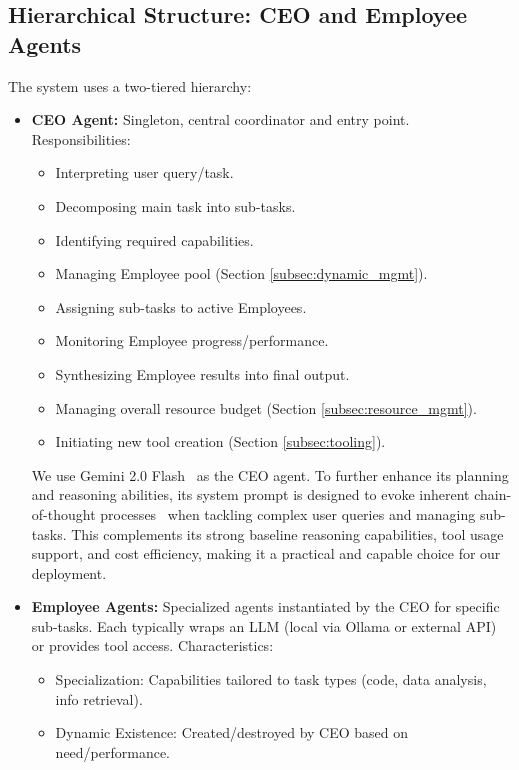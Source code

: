 \documentclass[conference]{IEEEtran}
\begin{document}
\subsection{Hierarchical Structure: CEO and Employee Agents}
The system uses a two-tiered hierarchy:

\begin{itemize}
    \item \textbf{CEO Agent:} Singleton, central coordinator and entry point. Responsibilities:
        \begin{itemize}
            \item Interpreting user query/task.
            \item Decomposing main task into sub-tasks.
            \item Identifying required capabilities.
            \item Managing Employee pool (Section \ref{subsec:dynamic_mgmt}).
            \item Assigning sub-tasks to active Employees.
            \item Monitoring Employee progress/performance.
            \item Synthesizing Employee results into final output.
            \item Managing overall resource budget (Section \ref{subsec:resource_mgmt}).
            \item Initiating new tool creation (Section \ref{subsec:tooling}).
        \end{itemize}
        We use Gemini 2.0 Flash~\cite{gemini20flash} as the CEO agent. To further enhance its planning and reasoning abilities, its system prompt is designed to evoke inherent chain-of-thought processes~\cite{wei2022chain} when tackling complex user queries and managing sub-tasks. This complements its strong baseline reasoning capabilities, tool usage support, and cost efficiency, making it a practical and capable choice for our deployment.
    \item \textbf{Employee Agents:} Specialized agents instantiated by the CEO for specific sub-tasks. Each typically wraps an LLM (local via Ollama \cite{ollama} or external API) or provides tool access. Characteristics:
        \begin{itemize}
            \item Specialization: Capabilities tailored to task types (code, data analysis, info retrieval).
            \item Dynamic Existence: Created/destroyed by CEO based on need/performance.

\end{itemize}
\end{itemize}
\end{document}
